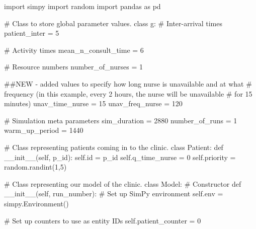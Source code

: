 \documentclass[
  letterpaper,
  DIV=11,
  numbers=noendperiod]{scrreprt}
\newenvironment{Shaded}{\begin{snugshade}}{\end{snugshade}}
\newcommand{\BuiltInTok}[1]{\textcolor[rgb]{0.00,0.23,0.31}{#1}}
\newcommand{\CommentTok}[1]{\textcolor[rgb]{0.37,0.37,0.37}{#1}}
\newcommand{\DecValTok}[1]{\textcolor[rgb]{0.68,0.00,0.00}{#1}}
\newcommand{\FunctionTok}[1]{\textcolor[rgb]{0.28,0.35,0.67}{#1}}
\newcommand{\ImportTok}[1]{\textcolor[rgb]{0.00,0.46,0.62}{#1}}
\newcommand{\KeywordTok}[1]{\textcolor[rgb]{0.00,0.23,0.31}{#1}}
\newcommand{\NormalTok}[1]{\textcolor[rgb]{0.00,0.23,0.31}{#1}}
\newcommand{\OperatorTok}[1]{\textcolor[rgb]{0.37,0.37,0.37}{#1}}
\newcommand{\VariableTok}[1]{\textcolor[rgb]{0.07,0.07,0.07}{#1}}
\begin{document}
\begin{Shaded}
\begin{Highlighting}[]
\ImportTok{import}\NormalTok{ simpy}
\ImportTok{import}\NormalTok{ random}
\ImportTok{import}\NormalTok{ pandas }\ImportTok{as}\NormalTok{ pd}

\CommentTok{\# Class to store global parameter values.}
\KeywordTok{class}\NormalTok{ g:}
    \CommentTok{\# Inter{-}arrival times}
\NormalTok{    patient\_inter }\OperatorTok{=} \DecValTok{5}

    \CommentTok{\# Activity times}
\NormalTok{    mean\_n\_consult\_time }\OperatorTok{=} \DecValTok{6}

    \CommentTok{\# Resource numbers}
\NormalTok{    number\_of\_nurses }\OperatorTok{=} \DecValTok{1}

    \CommentTok{\#\#NEW {-} added values to specify how long nurse is unavailable and at what}
    \CommentTok{\# frequency (in this example, every 2 hours, the nurse will be unavailable}
    \CommentTok{\# for 15 minutes)}
\NormalTok{    unav\_time\_nurse }\OperatorTok{=} \DecValTok{15}
\NormalTok{    unav\_freq\_nurse }\OperatorTok{=} \DecValTok{120}

    \CommentTok{\# Simulation meta parameters}
\NormalTok{    sim\_duration }\OperatorTok{=} \DecValTok{2880}
\NormalTok{    number\_of\_runs }\OperatorTok{=} \DecValTok{1}
\NormalTok{    warm\_up\_period }\OperatorTok{=} \DecValTok{1440}

\CommentTok{\# Class representing patients coming in to the clinic.}
\KeywordTok{class}\NormalTok{ Patient:}
    \KeywordTok{def} \FunctionTok{\_\_init\_\_}\NormalTok{(}\VariableTok{self}\NormalTok{, p\_id):}
        \VariableTok{self}\NormalTok{.}\BuiltInTok{id} \OperatorTok{=}\NormalTok{ p\_id}
        \VariableTok{self}\NormalTok{.q\_time\_nurse }\OperatorTok{=} \DecValTok{0}
        \VariableTok{self}\NormalTok{.priority }\OperatorTok{=}\NormalTok{ random.randint(}\DecValTok{1}\NormalTok{,}\DecValTok{5}\NormalTok{)}

\CommentTok{\# Class representing our model of the clinic.}
\KeywordTok{class}\NormalTok{ Model:}
    \CommentTok{\# Constructor}
    \KeywordTok{def} \FunctionTok{\_\_init\_\_}\NormalTok{(}\VariableTok{self}\NormalTok{, run\_number):}
        \CommentTok{\# Set up SimPy environment}
        \VariableTok{self}\NormalTok{.env }\OperatorTok{=}\NormalTok{ simpy.Environment()}

        \CommentTok{\# Set up counters to use as entity IDs}
        \VariableTok{self}\NormalTok{.patient\_counter }\OperatorTok{=} \DecValTok{0}


\end{Highlighting}
\end{Shaded}
\end{document}
